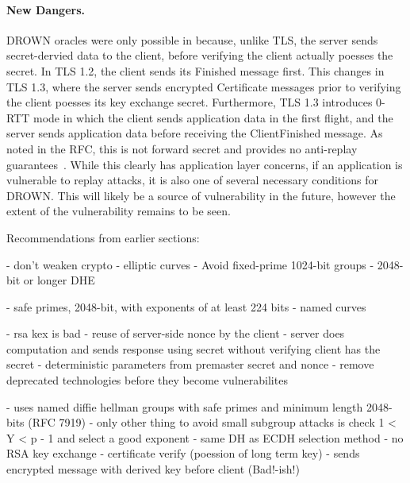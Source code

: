 \paragraph{New Dangers.}
DROWN oracles were only possible in \ssltwo because, unlike TLS, the server
sends secret-dervied data to the client, before verifying the client actually
poesses the secret. In TLS 1.2, the client sends its \textsf{Finished}
message first. This changes in TLS 1.3, where the server sends encrypted
\textsf{Certificate} messages prior to verifying the client poesses its key
exchange secret. Furthermore, TLS 1.3 introduces 0-RTT mode in which the
client sends application data in the first flight, and the server sends
application data before receiving the \textsf{ClientFinished} message. As
noted in the RFC, this is not forward secret and provides no anti-replay
guarantees~\cite{rfc8446}. While this clearly has application layer concerns,
if an application is vulnerable to replay attacks, it is also one of several
necessary conditions for DROWN. This will likely be a source of vulnerability
in the future, however the extent of the vulnerability remains to be seen.

Recommendations from earlier sections:

- don't weaken crypto
- elliptic curves
- Avoid fixed-prime 1024-bit groups
- 2048-bit or longer DHE

- safe primes, 2048-bit, with exponents of at least 224 bits
- named curves

- rsa kex is bad
- reuse of server-side nonce by the client
- server does computation and sends response using secret without verifying client has the secret
- deterministic parameters from premaster secret and nonce
- remove deprecated technologies before they become vulnerabilites

- uses named diffie hellman groups with safe primes and minimum length 2048-bits (RFC 7919)
- only other thing to avoid small subgroup attacks is check 1 < Y < p - 1 and select a good exponent
- same DH as ECDH selection method
- no RSA key exchange
- certificate verify (poession of long term key)
- sends encrypted message with derived key before client (Bad!-ish!)

\fi

%
%

